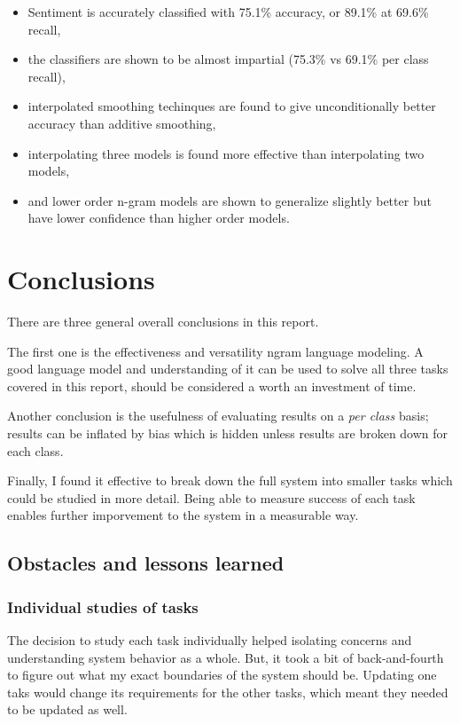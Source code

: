 \documentclass[a4paper,11pt]{kth-mag}
\begin{document}
\begin{itemize}
\item Sentiment is accurately classified with 75.1\% accuracy, or 89.1\% at 69.6\% recall,
\item the classifiers are shown to be almost impartial (75.3\% vs 69.1\% per class recall),
\item interpolated smoothing techinques are found to give unconditionally better accuracy than additive smoothing,
\item interpolating three models is found more effective than interpolating two models,
\item and lower order n-gram models are shown to generalize slightly better but have lower confidence than higher order models.
\end{itemize}

\section{Conclusions}

There are three general overall conclusions in this report.

The first one is the effectiveness and versatility ngram language modeling.
A good language model and understanding of it can be used to solve all three
tasks covered in this report, should be considered a worth an investment of time.

Another conclusion is the usefulness of evaluating results on a \emph{per class} basis;
results can be inflated by bias which is hidden unless results are broken down for each class.

Finally, I found it effective to break down the full system into smaller tasks which could be studied in more detail.
Being able to measure success of each task enables further imporvement to the system in a measurable way.


\subsection{Obstacles and lessons learned}


\subsubsection{Individual studies of tasks}
The decision to study each task individually helped isolating concerns and understanding system behavior as a whole. But, it took a bit of back-and-fourth to figure out what my exact boundaries of the system should be. Updating one taks would change its requirements for the other tasks, which meant they needed to be updated as well.
\end{document}
